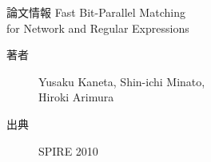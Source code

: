 \documentclass[dvipdfmx,beamer]{standalone}
\begin{document}
\begin{frame}{論文情報}
	Fast Bit-Parallel Matching \\ for Network and Regular Expressions
	\begin{description}
		\item[著者] Yusaku Kaneta, Shin-ichi Minato, \\ Hiroki Arimura
		\item[出典] SPIRE 2010
	\end{description}
\end{frame}
\end{document}
